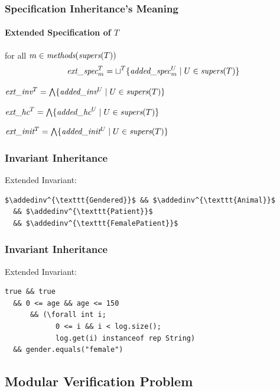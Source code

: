 \begin{frame}
\frametitle{Specification Inheritance's Meaning}
\framesubtitle{Extended Specification of $T$}

\begin{description}[Constraint:]
\item[Methods:]
for all $m \in \textit{methods}(\textit{supers}(T))$
\begin{displaymath}
{\textit{ext}}\_{\textit{spec}}^T_m = \sqcup^T \{{\textit{added}}\_{\textit{spec}}^U_m \mid U \in \textit{supers}(T)\}
\end{displaymath}

\item[Invariant:]
${\textit{ext}}\_{\textit{inv}}^T = \bigwedge \{{\textit{added}}\_{\textit{inv}}^U \mid U \in \textit{supers}(T)\}$

\item[Constraint:]
${\textit{ext}}\_{\textit{hc}}^T = \bigwedge \{{\textit{added}}\_{\textit{hc}}^U \mid U \in \textit{supers}(T)\}$

\item[Initially:]
${\textit{ext}}\_{\textit{init}}^T = \bigwedge \{{\textit{added}}\_{\textit{init}}^U \mid U \in \textit{supers}(T)\}$
\end{description}
\end{frame}

\begin{frame}[fragile]
\frametitle{Invariant Inheritance}


Extended Invariant:

\begin{lstlisting}[mathescape=true]
  $\addedinv^{\texttt{Gendered}}$ && $\addedinv^{\texttt{Animal}}$
  && $\addedinv^{\texttt{Patient}}$
  && $\addedinv^{\texttt{FemalePatient}}$
\end{lstlisting}
\end{frame}

\begin{frame}[fragile]
\frametitle{Invariant Inheritance}


Extended Invariant:

\begin{lstlisting}[mathescape=true]
  true && true
  && 0 <= age && age <= 150
      && (\forall int i;
            0 <= i && i < log.size();
            log.get(i) instanceof rep String)
  && gender.equals("female")
\end{lstlisting}
\end{frame}

\subsection[Modularity]{Modular Verification Problem}

